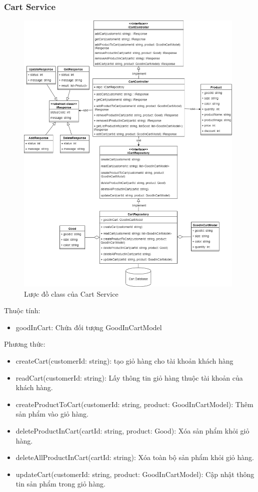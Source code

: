 \subsubsection{Cart Service}
\begin{figure}[!htp]
	\centering
	\includegraphics[width=11cm]{img/Architecture/service/CartService.png}
	\newline
	\caption{Lược đồ class của Cart Service}
\end{figure}

Thuộc tính:
\begin{itemize}
	\item goodInCart: Chứa đối tượng GoodInCartModel
\end{itemize}
Phương thức:
\begin{itemize}
	\item createCart(customerId: string): tạo giỏ hàng cho tài khoản khách hàng
	\item readCart(customerId: string): Lấy thông tin giỏ hàng thuộc tài khoản của khách hàng.
	\item createProductToCart(customerId: string, product: GoodInCartModel): Thêm sản phẩm vào giỏ hàng.
	\item deleteProductInCart(cartId: string, product: Good): Xóa sản phẩm khỏi giỏ hàng.
	\item deleteAllProductInCart(cartId: string): Xóa toàn bộ sản phẩm khỏi giỏ hàng.
	\item updateCart(customerId: string, product: GoodInCartModel): Cập nhật thông tin sản phẩm trong giỏ hàng.
\end{itemize}

